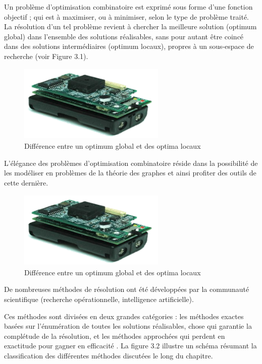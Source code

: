 Un problème d’optimisation combinatoire est exprimé sous forme d’une fonction objectif ; qui est à maximiser, ou à minimiser, selon le type de problème traité. La résolution d’un tel problème revient à chercher la meilleure solution (optimum global) dans l’ensemble des solutions réalisables, sans pour autant être coincé dans des solutions intermédiaires (optimum locaux), propres à un sous-espace de recherche (voir Figure 3.1).

\begin{figure}[h]
	\centering
	\includegraphics[width=7cm,height=3.7cm]{Chap1/1.png}
	\caption{Différence entre un optimum global et des optima locaux}
	\label{fig:CSF}
\end{figure}

L’élégance des problèmes d’optimisation combinatoire réside dans la possibilité de les modéliser en problèmes de la théorie des graphes et ainsi profiter des outils de cette dernière.

\begin{figure}[h]
	\centering
	\includegraphics[width=7cm,height=3.7cm]{Chap1/1.png}
	\caption{Différence entre un optimum global et des optima locaux}
	\label{fig:CSF}
\end{figure}

De nombreuses méthodes de résolution ont été développées par la communauté scientifique (recherche opérationnelle, intelligence artificielle).

Ces méthodes sont divisées en deux grandes catégories : les méthodes exactes basées sur l’énumération de toutes les solutions réalisables, chose qui garantie la complétude de la résolution, et les méthodes approchées qui perdent en exactitude pour gagner en efficacité \cite{park2007dominating} . La figure 3.2 illustre un schéma résumant la classification des différentes méthodes discutées le long du chapitre.

